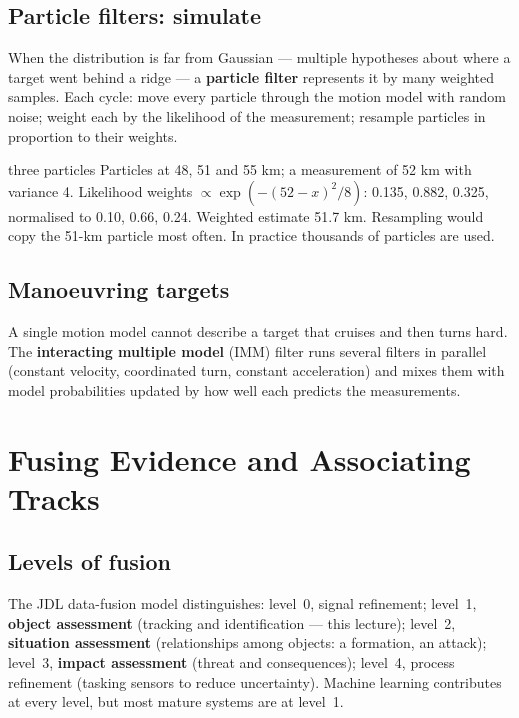 \documentclass[11pt]{article}
\begin{document}
\subsection{Particle filters: simulate}
When the distribution is far from Gaussian --- multiple hypotheses about where a target went behind a ridge --- a \textbf{particle filter} represents it by many weighted samples. Each cycle: move every particle through the motion model with random noise; weight each by the likelihood of the measurement; resample particles in proportion to their weights.
\begin{example}{three particles}
Particles at 48, 51 and 55 km; a measurement of 52 km with variance 4. Likelihood weights $\propto\exp(-(52-x)^2/8)$: 0.135, 0.882, 0.325, normalised to 0.10, 0.66, 0.24. Weighted estimate 51.7 km. Resampling would copy the 51-km particle most often. In practice thousands of particles are used.
\end{example}
\subsection{Manoeuvring targets}
A single motion model cannot describe a target that cruises and then turns hard. The \textbf{interacting multiple model} (IMM) filter runs several filters in parallel (constant velocity, coordinated turn, constant acceleration) and mixes them with model probabilities updated by how well each predicts the measurements.

\section{Fusing Evidence and Associating Tracks}
\subsection{Levels of fusion}
The JDL data-fusion model distinguishes: level~0, signal refinement; level~1, \textbf{object assessment} (tracking and identification --- this lecture); level~2, \textbf{situation assessment} (relationships among objects: a formation, an attack); level~3, \textbf{impact assessment} (threat and consequences); level~4, process refinement (tasking sensors to reduce uncertainty). Machine learning contributes at every level, but most mature systems are at level~1.
\end{document}
